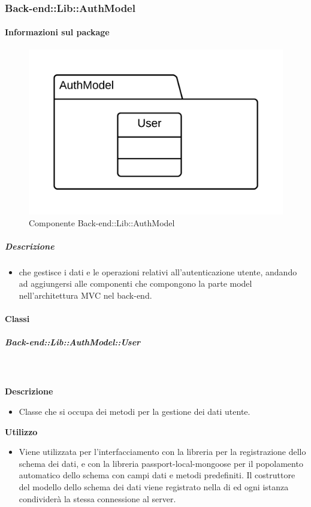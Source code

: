   \subsubsection{Back-end::Lib::AuthModel}
  \paragraph{Informazioni sul package} 
    \begin{figure}[H] 
      \begin{center} 
        \includegraphics[scale=0.16]{packages/Back-end::Lib::AuthModel.png}  
        \caption{Componente Back-end::Lib::AuthModel}
      \end{center}  
    \end{figure} 
  \subparagraph{Descrizione} 
    \begin{itemize}
    \item[]  che gestisce i dati e le operazioni relativi all'autenticazione utente, andando ad aggiungersi alle componenti che compongono la parte model nell'architettura MVC nel back-end. 
    \end{itemize} 
    \paragraph{Classi}
      \subparagraph{Back-end::Lib::AuthModel::User}
        
        \textbf{\\ \\ Descrizione} 
          \begin{itemize}
            \item[] Classe che si occupa dei metodi per la gestione dei dati utente. 
          \end{itemize}      
        \textbf{Utilizzo}  
          \begin{itemize}
            \item[] Viene utilizzata per l'interfacciamento con la libreria  per la registrazione dello schema dei dati, e con la libreria passport-local-mongoose per il popolamento automatico dello schema con campi dati e metodi predefiniti.
Il costruttore del modello dello schema dei dati viene registrato nella  di  ed ogni istanza condividerà la stessa connessione al server.
          \end{itemize}
